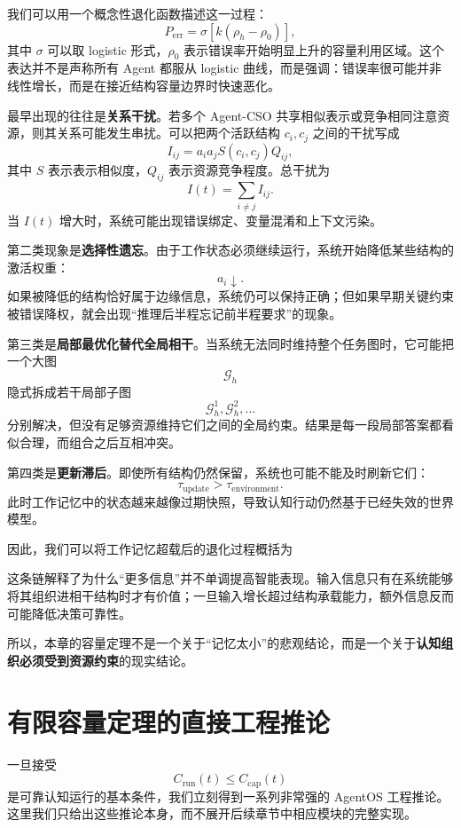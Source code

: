 我们可以用一个概念性退化函数描述这一过程：
\[
P_{\mathrm{err}}
=
\sigma
\left[
k
(\rho_h-\rho_0)
\right],
\]
其中 $\sigma$ 可以取 logistic 形式，$\rho_0$ 表示错误率开始明显上升的容量利用区域。这个表达并不是声称所有 Agent 都服从 logistic 曲线，而是强调：错误率很可能并非线性增长，而是在接近结构容量边界时快速恶化。

最早出现的往往是\textbf{关系干扰}。若多个 Agent-CSO 共享相似表示或竞争相同注意资源，则其关系可能发生串扰。可以把两个活跃结构 $c_i,c_j$ 之间的干扰写成
\[
I_{ij}
=
a_i a_j
S(c_i,c_j)
Q_{ij},
\]
其中 $S$ 表示表示相似度，$Q_{ij}$ 表示资源竞争程度。总干扰为
\[
I(t)
=
\sum_{i\neq j}I_{ij}.
\]
当 $I(t)$ 增大时，系统可能出现错误绑定、变量混淆和上下文污染。

第二类现象是\textbf{选择性遗忘}。由于工作状态必须继续运行，系统开始降低某些结构的激活权重：
\[
a_i\downarrow.
\]
如果被降低的结构恰好属于边缘信息，系统仍可以保持正确；但如果早期关键约束被错误降权，就会出现“推理后半程忘记前半程要求”的现象。

第三类是\textbf{局部最优化替代全局相干}。当系统无法同时维持整个任务图时，它可能把一个大图
\[
\mathcal G_h
\]
隐式拆成若干局部子图
\[
\mathcal G_h^1,
\mathcal G_h^2,\ldots
\]
分别解决，但没有足够资源维持它们之间的全局约束。结果是每一段局部答案都看似合理，而组合之后互相冲突。

第四类是\textbf{更新滞后}。即使所有结构仍然保留，系统也可能不能及时刷新它们：
\[
\tau_{\mathrm{update}}
>
\tau_{\mathrm{environment}}.
\]
此时工作记忆中的状态越来越像过期快照，导致认知行动仍然基于已经失效的世界模型。

因此，我们可以将工作记忆超载后的退化过程概括为
\begin{statementbox}
\centering
{}
\end{statementbox}
这条链解释了为什么“更多信息”并不单调提高智能表现。输入信息只有在系统能够将其组织进相干结构时才有价值；一旦输入增长超过结构承载能力，额外信息反而可能降低决策可靠性。

所以，本章的容量定理不是一个关于“记忆太小”的悲观结论，而是一个关于\textbf{认知组织必须受到资源约束}的现实结论。


\section{有限容量定理的直接工程推论}
\label{sec:engineering-corollaries}

一旦接受
\[
C_{\mathrm{run}}(t)
\leq
C_{\mathrm{cap}}(t)
\]
是可靠认知运行的基本条件，我们立刻得到一系列非常强的 AgentOS 工程推论。这里我们只给出这些推论本身，而不展开后续章节中相应模块的完整实现。

